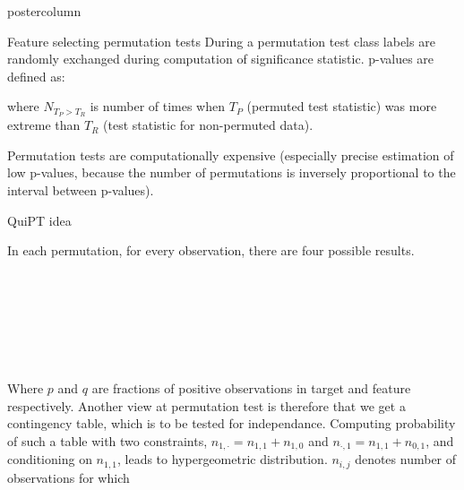 \documentclass[final]{beamer}\usepackage[]{graphicx}\usepackage[]{color}
\begin{document}
\begin{frame}
\begin{columns}
\begin{column}{.49\textwidth}
\begin{beamercolorbox}[center,wd=\textwidth]{postercolumn}
\begin{minipage}[T]{.95\textwidth}
{\begin{block}{Feature selecting permutation tests}
    During a permutation test class labels are randomly exchanged during computation of significance statistic. p-values are defined as:
    
\begin{center}
\end{center}

where $N_{T_P > T_R}$ is number of times when $T_P$ (permuted test statistic) was more extreme than $T_R$ (test statistic for non-permuted data).

Permutation tests are computationally expensive (especially precise estimation of low p-values, because the number of permutations is inversely proportional to the interval between p-values).
      
    \end{block}
    \vfill
    
    
\begin{block}{QuiPT idea}

In each permutation, for every observation, there are four possible results.

\begin{center}
\scalebox{0.85}{
$P(Target, Feature) = (1,1)) = p \cdot q$
}
\end{center}

\\

\begin{center}
\scalebox{0.85}{
$P(Target, Feature) = (1,0)) = p \cdot (1-q)$
}
\end{center}

\\

\begin{center}
\scalebox{0.85}{
$P(Target, Feature) = (0,1)) = (1-p) \cdot q$
}
\end{center}

\\

\begin{center}
\scalebox{0.85}{
$P(Target, Feature) = (0,0)) = (1-p) \cdot (1-q)$
}
\end{center}

\\

Where $p$ and $q$ are fractions of positive observations in target and
feature respectively. Another view at permutation test is therefore that we 
get a contingency table, which is to be tested for independance.
Computing probability of such a table with two constraints, $n_{1,\cdot} = n_{1,1} + n_{1,0}$ and
$n_{\cdot, 1} = n_{1,1} + n_{0,1}$, and 
conditioning on $n_{1,1}$, leads to hypergeometric distribution.
$n_{i,j}$ denotes number of observations for which 
\scalebox{0.85}{$(Target, Feature) = (i,j)$}


\end{block}}
\end{minipage}
\end{beamercolorbox}
\end{column}
\end{columns}
\end{frame}
\end{document}
